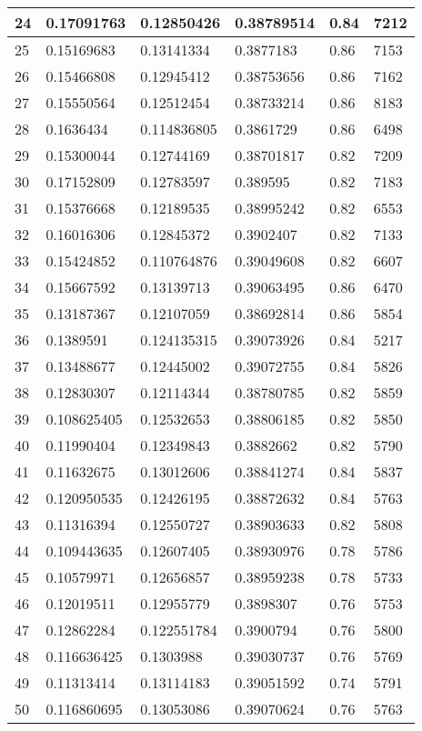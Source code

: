 \begin{longtable}{|l|l|l|l|l|l|}
24 & 0.17091763 & 0.12850426 & 0.38789514 & 0.84 & 7212 \\ \hline 
25 & 0.15169683 & 0.13141334 & 0.3877183 & 0.86 & 7153 \\ \hline 
26 & 0.15466808 & 0.12945412 & 0.38753656 & 0.86 & 7162 \\ \hline 
27 & 0.15550564 & 0.12512454 & 0.38733214 & 0.86 & 8183 \\ \hline 
28 & 0.1636434 & 0.114836805 & 0.3861729 & 0.86 & 6498 \\ \hline 
29 & 0.15300044 & 0.12744169 & 0.38701817 & 0.82 & 7209 \\ \hline 
30 & 0.17152809 & 0.12783597 & 0.389595 & 0.82 & 7183 \\ \hline 
31 & 0.15376668 & 0.12189535 & 0.38995242 & 0.82 & 6553 \\ \hline 
32 & 0.16016306 & 0.12845372 & 0.3902407 & 0.82 & 7133 \\ \hline 
33 & 0.15424852 & 0.110764876 & 0.39049608 & 0.82 & 6607 \\ \hline 
34 & 0.15667592 & 0.13139713 & 0.39063495 & 0.86 & 6470 \\ \hline 
35 & 0.13187367 & 0.12107059 & 0.38692814 & 0.86 & 5854 \\ \hline 
36 & 0.1389591 & 0.124135315 & 0.39073926 & 0.84 & 5217 \\ \hline 
37 & 0.13488677 & 0.12445002 & 0.39072755 & 0.84 & 5826 \\ \hline 
38 & 0.12830307 & 0.12114344 & 0.38780785 & 0.82 & 5859 \\ \hline 
39 & 0.108625405 & 0.12532653 & 0.38806185 & 0.82 & 5850 \\ \hline 
40 & 0.11990404 & 0.12349843 & 0.3882662 & 0.82 & 5790 \\ \hline 
41 & 0.11632675 & 0.13012606 & 0.38841274 & 0.84 & 5837 \\ \hline 
42 & 0.120950535 & 0.12426195 & 0.38872632 & 0.84 & 5763 \\ \hline 
43 & 0.11316394 & 0.12550727 & 0.38903633 & 0.82 & 5808 \\ \hline 
44 & 0.109443635 & 0.12607405 & 0.38930976 & 0.78 & 5786 \\ \hline 
45 & 0.10579971 & 0.12656857 & 0.38959238 & 0.78 & 5733 \\ \hline 
46 & 0.12019511 & 0.12955779 & 0.3898307 & 0.76 & 5753 \\ \hline 
47 & 0.12862284 & 0.122551784 & 0.3900794 & 0.76 & 5800 \\ \hline 
48 & 0.116636425 & 0.1303988 & 0.39030737 & 0.76 & 5769 \\ \hline 
49 & 0.11313414 & 0.13114183 & 0.39051592 & 0.74 & 5791 \\ \hline 
50 & 0.116860695 & 0.13053086 & 0.39070624 & 0.76 & 5763 \\ \hline 
\end{longtable}